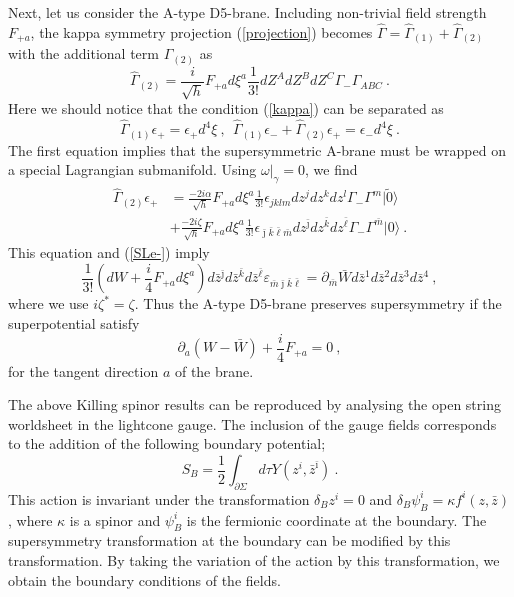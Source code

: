 \documentclass[a4paper,12pt]{article}
\numberwithin{equation}{section}
\newcommand{\del}{\partial}
\newcommand{\ib}{\bar{\imath}}
\newcommand{\jb}{\bar{\jmath}}
\newcommand{\kb}{\bar{k}}
\newcommand{\lb}{\bar{\ell}}
\newcommand{\mb}{\bar{m}}
\newcommand{\zb}{\bar{z}}
\newcommand{\ve}{\varepsilon}
\newcommand{\vac}{|0\rangle}
\newcommand{\vact}{|\tilde 0\rangle}
\begin{document}
Next, let us consider the A-type D5-brane.
Including non-trivial field strength $F_{+a}$, the kappa symmetry
projection (\ref{projection}) becomes
$\hat{\Gamma} = \hat{\Gamma}_{(1)} + \hat{\Gamma}_{(2)}$ with the
additional term $\Gamma_{(2)}$ as
\begin{equation}
 \hat{\Gamma}_{(2)} = 
  \frac{i}{\sqrt{h}}  F_{+a} d \xi^a \frac{1}{3!}
 d Z^A d Z^B d Z^C \Gamma_- \Gamma_{ABC} ~.
\end{equation}
Here we should notice that the condition (\ref{kappa}) can be separated as
\begin{equation}
 \hat{\Gamma}_{(1)} \epsilon_+ = \epsilon_+ d^4\xi ~,~~
 \hat{\Gamma}_{(1)} \epsilon_- + \hat{\Gamma}_{(2)} \epsilon_+ 
  = \epsilon_-d^4\xi
   ~.
\end{equation}
The first equation implies that 
the supersymmetric A-brane must be wrapped on a special Lagrangian
submanifold.
Using $\omega|_{\gamma}=0$, we find
\begin{align}
\hat{\Gamma}_{(2)} \epsilon_+ &= \frac{- 2 i \alpha}{\sqrt{h}} 
      F_{+a}d \xi^a \frac{1}{3!} 
     \epsilon_{jklm} d z^j d z^k d z^l \Gamma_- \Gamma^m \vact
 \nonumber \\ &
+  \frac{- 2 i \zeta}{\sqrt{h}} 
      F_{+a}d \xi^a \frac{1}{3!} 
     \epsilon_{\jb \kb \lb \mb} d z^{\jb} d z^{\kb} d z^{\lb} 
    \Gamma_- \Gamma^{\mb} \vac ~.
\end{align}
This equation and (\ref{SLe-}) imply 
\begin{equation}
 \frac{1}{3!} \left( dW + \frac{i}{4 } F_{+a} d \xi^a \right) 
 d\zb^{\jb}d\zb^{\kb}d\zb^{\lb}\ve_{\mb\jb\kb\lb}
  =\del_{\mb}\bar W d\zb^{1}d\zb^{2}d\zb^{3}d\zb^{4}~,
\end{equation}
where we use $ i \zeta^* = \zeta$.
Thus the A-type D5-brane  preserves 
supersymmetry if the superpotential satisfy
\begin{equation}
 \partial_a (W -  \bar{W}) + \frac{i}{4} F_{+a} = 0~,
\label{modAD5}
\end{equation}
for the tangent direction $a$ of the brane.


The above Killing spinor results can be reproduced by analysing the  
open string worldsheet in the lightcone gauge.
The inclusion of the gauge fields corresponds to the addition of the following
boundary potential;
\begin{equation}
 S_B = 
 \frac{1}{2} \int _{\partial \Sigma} d \tau Y ( z^i, \zb^{\ib})~.
\end{equation}
This action is invariant under the transformation $\delta_B z^i = 0 $
and $\delta_B \psi_{B}^i = \kappa f^i (z, \zb) $, where $\kappa$ is a
spinor and $\psi_B^i$ is the fermionic coordinate at the boundary.
The supersymmetry transformation at the boundary can be modified by this
transformation.
By taking the variation of the action by this transformation, 
we obtain the boundary conditions of the fields.
\end{document}
